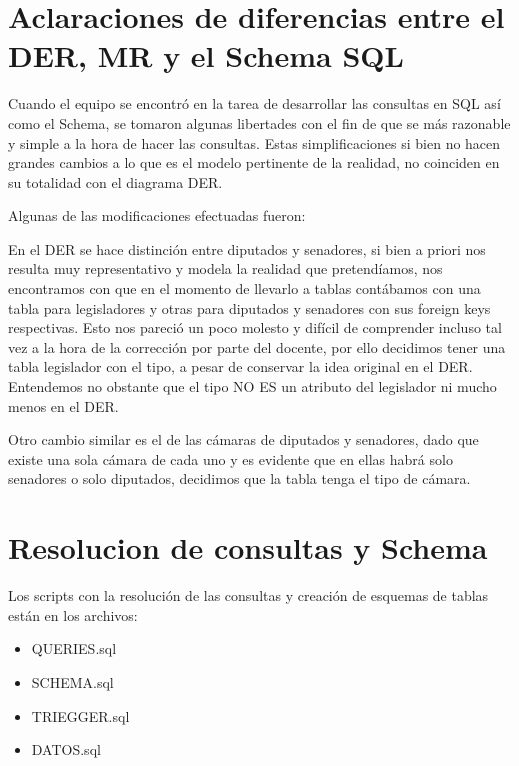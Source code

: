\documentclass[10pt, a4paper]{article}
\begin{document}
\section{Aclaraciones de diferencias entre el DER, MR y el Schema SQL}

Cuando el equipo se encontr\'o en la tarea de desarrollar las consultas en SQL as\'i como el Schema, se tomaron algunas libertades con el fin de que se m\'as razonable y simple a la hora de hacer las consultas. Estas simplificaciones si bien no hacen grandes cambios a lo que es el modelo pertinente de la realidad, no coinciden en su totalidad con el diagrama DER. 

Algunas de las modificaciones efectuadas fueron:

En el DER se hace distinci\'on entre diputados y senadores, si bien a priori nos resulta muy representativo y modela la realidad que pretend\'iamos, nos encontramos con que en el momento de llevarlo a tablas cont\'abamos con una tabla para legisladores y otras para diputados y senadores con sus foreign keys respectivas. Esto nos pareci\'o un poco molesto y dif\'icil de comprender incluso tal vez a la hora de la correcci\'on por parte del docente, por ello decidimos tener una tabla legislador con el tipo, a pesar de conservar la idea original en el DER. 
Entendemos no obstante que el tipo NO ES un atributo del legislador ni mucho menos en el DER.

Otro cambio similar es el de las c\'amaras de diputados y senadores, dado que existe una sola c\'amara de cada uno y es evidente que en ellas habr\'a solo senadores o solo diputados, decidimos que la tabla tenga el tipo de c\'amara.

\section{Resolucion de consultas y Schema}

Los scripts con la resoluci\'on de las consultas y creaci\'on de esquemas de tablas est\'an en los archivos:

\begin{itemize}

	\item QUERIES.sql
	\item SCHEMA.sql
	\item TRIEGGER.sql
	\item DATOS.sql

\end{itemize}
\end{document}
